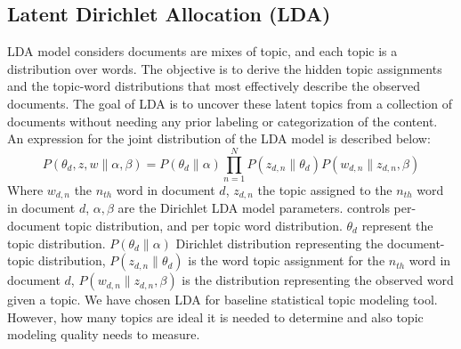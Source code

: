 \documentclass[sn-mathphys,Numbered]{sn-jnl}%
\theoremstyle{thmstyleone}%
\theoremstyle{thmstyletwo}%
\theoremstyle{thmstylethree}%
\begin{document}
\subsection{Latent Dirichlet Allocation (LDA)}
\label{lda_mdel}
LDA model \cite{jelodar_latent_2019, gupta_pan_lda_2021, pichardo_lagunas_svd_lda_2015, selvi_classification_2019} considers documents are mixes of topic, and each topic is a distribution over words. The objective is to derive the hidden topic assignments and the topic-word distributions that most effectively describe the observed documents. The goal of LDA is to uncover these latent topics from a collection of documents without needing any prior labeling or categorization of the content. An expression for the joint distribution of the LDA model is described below:  
\begin{equation}
P(\theta_d,z,w\|\alpha,\beta)=P(\theta_d\|\alpha)\prod^N_{n=1}P(z_{d,n}\|\theta_d)P(w_{d,n}\|z_{d,n},\beta)
\end{equation}
Where $w_{d,n}$ the $n_{th}$ word in document $d$, $z_{d,n}$ the topic assigned to the $n_{th}$ word in document $d$, $\alpha,\beta$ are the Dirichlet LDA model parameters. controls per-document topic distribution, and per topic word distribution. $\theta_d$ represent the topic distribution. $P(\theta_d \| \alpha)$ Dirichlet 
distribution representing the document-topic distribution, $P(z_{d,n}\|\theta_d)$ is the word topic assignment for the $n_{th}$ word in document $d$, $P(w_{d,n}\|z_{d,n},\beta)$ is the distribution representing the observed word given a topic. We have chosen LDA for baseline statistical topic modeling tool. However, how many topics are ideal it is needed to determine and also topic modeling quality needs to measure.
\end{document}
